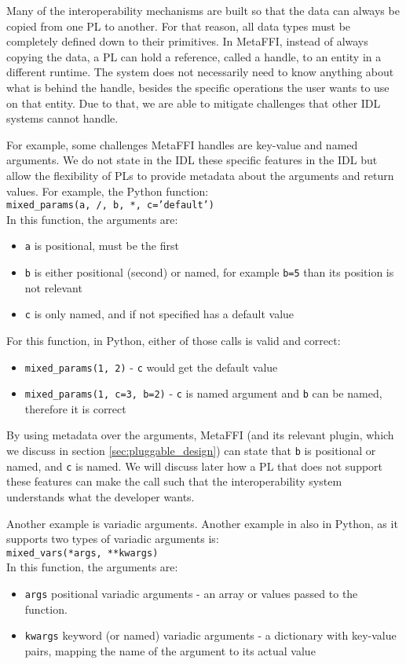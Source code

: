 \documentclass[sigplan,10pt,manuscript,nonacm]{acmart}
\begin{document}
Many of the interoperability mechanisms are built so that the data can always be copied from one PL to another. For that reason, all data types must be completely defined down to their primitives. In MetaFFI, instead of always copying the data, a PL can hold a reference, called a handle, to an entity in a different runtime. The system does not necessarily need to know anything about what is behind the handle, besides the specific operations the user wants to use on that entity. Due to that, we are able to mitigate challenges that other IDL systems cannot handle.
 
For example, some challenges MetaFFI handles are key-value and named arguments. We do not state in the IDL these specific features in the IDL but allow the flexibility of PLs to provide metadata about the arguments and return values. For example, the Python function:\\
\texttt{mixed\_params(a, /, b, *, c='default')}\\
In this function, the arguments are:
\begin{itemize}
    \item \texttt{a} is positional, must be the first
    \item \texttt{b} is either positional (second) or named, for example \texttt{b=5} than its position is not relevant
    \item \texttt{c} is only named, and if not specified has a default value
\end{itemize}

For this function, in Python, either of those calls is valid and correct:
\begin{itemize}
    \item \texttt{mixed\_params(1, 2)} - \texttt{c} would get the default value
    \item \texttt{mixed\_params(1, c=3, b=2)} - \texttt{c} is named argument and \texttt{b} can be named, therefore it is correct 
\end{itemize}

By using metadata over the arguments, MetaFFI (and its relevant plugin, which we discuss in section \ref{sec:pluggable_design}) can state that \texttt{b} is positional or named, and \texttt{c} is named. We will discuss later how a PL that does not support these features can make the call such that the interoperability system understands what the developer wants.

Another example is variadic arguments. Another example in also in Python, as it supports two types of variadic arguments is:\\
\texttt{mixed\_vars(*args, **kwargs)}\\
In this function, the arguments are:
\begin{itemize}
    \item \texttt{args} positional variadic arguments - an array or values passed to the function.
    \item \texttt{kwargs} keyword (or named) variadic arguments - a dictionary with key-value pairs, mapping the name of the argument to its actual value
\end{itemize}
\end{document}
